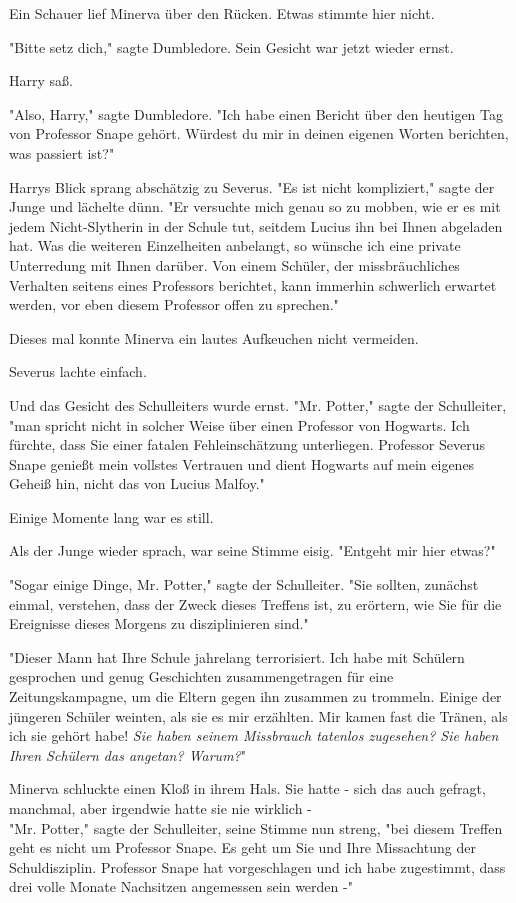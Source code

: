 {Ein Schauer lief Minerva über den Rücken. Etwas stimmte hier nicht.

"Bitte setz dich," sagte Dumbledore. Sein Gesicht war jetzt wieder ernst.

Harry saß.

"Also, Harry," sagte Dumbledore. "Ich habe einen Bericht über den heutigen Tag von Professor Snape gehört. Würdest du mir in deinen eigenen Worten berichten, was passiert ist?"

Harrys Blick sprang abschätzig zu Severus. "Es ist nicht kompliziert," sagte der Junge und lächelte dünn. "Er versuchte mich genau so zu mobben, wie er es mit jedem Nicht-Slytherin in der Schule tut, seitdem Lucius ihn bei Ihnen abgeladen hat. Was die weiteren Einzelheiten anbelangt, so wünsche ich eine private Unterredung mit Ihnen darüber. Von einem Schüler, der missbräuchliches Verhalten seitens eines Professors berichtet, kann immerhin schwerlich erwartet werden, vor eben diesem Professor offen zu sprechen."

Dieses mal konnte Minerva ein lautes Aufkeuchen nicht vermeiden.

Severus lachte einfach.

Und das Gesicht des Schulleiters wurde ernst. "Mr. Potter," sagte der Schulleiter, "man spricht nicht in solcher Weise über einen Professor von Hogwarts. Ich fürchte, dass Sie einer fatalen Fehleinschätzung unterliegen. Professor Severus Snape genießt mein vollstes Vertrauen und dient Hogwarts auf mein eigenes Geheiß hin, nicht das von Lucius Malfoy."

Einige Momente lang war es still.

Als der Junge wieder sprach, war seine Stimme eisig. "Entgeht mir hier etwas?"

"Sogar einige Dinge, Mr. Potter," sagte der Schulleiter. "Sie sollten, zunächst einmal, verstehen, dass der Zweck dieses Treffens ist, zu erörtern, wie Sie für die Ereignisse dieses Morgens zu disziplinieren sind."

"Dieser Mann hat Ihre Schule jahrelang terrorisiert. Ich habe mit Schülern gesprochen und genug Geschichten zusammengetragen für eine Zeitungskampagne, um die Eltern gegen ihn zusammen zu trommeln. Einige der jüngeren Schüler weinten, als sie es mir erzählten. Mir kamen fast die Tränen, als ich sie gehört habe! \emph{Sie haben seinem Missbrauch tatenlos zugesehen? Sie haben Ihren Schülern das angetan? Warum?}"

Minerva schluckte einen Kloß in ihrem Hals. Sie hatte - sich das auch gefragt, manchmal, aber irgendwie hatte sie nie wirklich -\\ "Mr. Potter," sagte der Schulleiter, seine Stimme nun streng, "bei diesem Treffen geht es nicht um Professor Snape. Es geht um Sie und Ihre Missachtung der Schuldisziplin. Professor Snape hat vorgeschlagen und ich habe zugestimmt, dass drei volle Monate Nachsitzen angemessen sein werden -"

}
